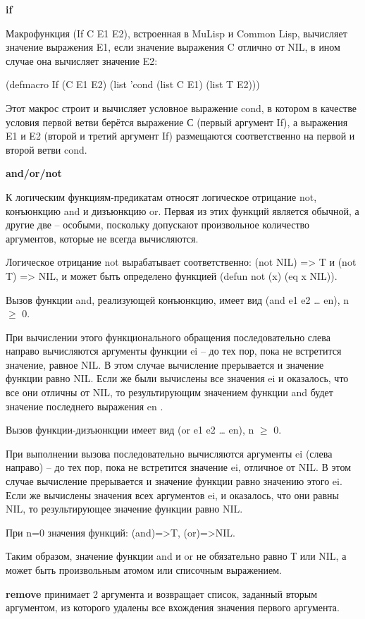 \documentclass[12pt]{report}
\begin{document}
 
\textbf{if}

Макрофункция (If C E1 E2), встроенная в MuLisp и Common Lisp, вычисляет значение выражения E1, если значение выражения C отлично от NIL, в ином случае она вычисляет значение E2:

(defmacro If (C E1 E2) (list 'cond (list C E1) (list T E2)))

Этот макрос строит и вычисляет условное выражение cond, в котором в качестве условия первой ветви берётся выражение С (первый аргумент If), а выражения E1 и E2 (второй и третий аргумент If) размещаются соответственно на первой и второй ветви cond.


\textbf{and/or/not}

К логическим функциям-предикатам относят логическое отрицание not, конъюнкцию and и дизъюнкцию or. Первая из этих функций является обычной, а другие две – особыми, поскольку допускают произвольное количество аргументов, которые не всегда вычисляются. 

Логическое отрицание not вырабатывает соответственно: (not NIL) => T и (not T) => NIL, и может быть определено функцией (defun not (x) (eq x NIL)).


Вызов функции and, реализующей конъюнкцию, имеет вид (and e1 e2 … en), n $\geqslant$ 0. 

При вычислении этого функционального обращения последовательно слева направо вычисляются аргументы функции ei – до тех пор, пока не  встретится значение, равное NIL. В этом случае вычисление прерывается и значение функции равно NIL. Если же были вычислены все значения ei и  оказалось, что все они отличны от NIL, то результирующим значением функции and будет значение последнего выражения en .

Вызов функции-дизъюнкции имеет вид (or e1 e2 … en), n $\geqslant$ 0. 

При выполнении вызова последовательно вычисляются аргументы ei (слева направо) – до тех пор, пока не встретится значение ei, отличное от NIL. В этом случае вычисление прерывается и значение функции равно значению этого ei. Если же вычислены значения всех аргументов ei, и оказалось, что они равны NIL, то результирующее значение функции равно NIL.

При n=0 значения функций: (and)=>T, (or)=>NIL.

Таким образом, значение функции and и or не обязательно равно Т или NIL, а может быть произвольным атомом или списочным выражением.


\textbf{remove} принимает 2 аргумента и возвращает список, заданный вторым аргументом, из которого удалены все вхождения значения первого аргумента.
\end{document}
